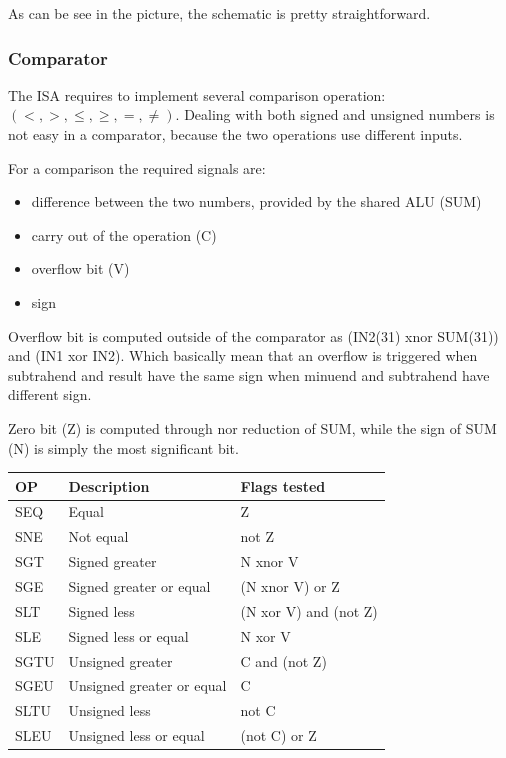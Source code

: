 \documentclass[12pt]{article}
\begin{document}
As can be see in the picture, the schematic is pretty straightforward.


\subsubsection{Comparator}
The ISA requires to implement several comparison operation: $(<, >, \leq, \geq, =, \neq)$.
Dealing with both signed and unsigned numbers is not easy in a comparator, because the two operations use different inputs.

For a comparison the required signals are:
\begin{itemize}
	\item difference between the two numbers, provided by the shared ALU (SUM)
	\item carry out of the operation (C)
	\item overflow bit (V)
	\item sign
\end{itemize}
Overflow bit is computed outside of the comparator as (IN2(31) xnor SUM(31)) and (IN1 xor IN2).
Which basically mean that an overflow is triggered when subtrahend and result have the same sign when minuend and subtrahend have different sign.

Zero bit (Z) is computed through nor reduction of SUM, while the sign of SUM (N) is simply the most significant bit.

\begin{center}
	\begin{tabular}{ | l | l | l |}
		\hline
		OP & Description & Flags tested \\ \hline
		SEQ & Equal & Z \\ \hline
		SNE & Not equal &  not Z \\ \hline
		SGT & Signed greater & N xnor V \\ \hline
		SGE & Signed greater or equal & (N  xnor  V) or Z \\ \hline
		SLT & Signed less & (N xor V) and (not Z)\\ \hline
		SLE & Signed less or equal & N xor V \\ \hline
		SGTU & Unsigned greater & C and (not Z) \\ \hline
		SGEU & Unsigned greater or equal & C \\ \hline
		SLTU & Unsigned less & not C \\ \hline
		SLEU & Unsigned less or equal & (not C) or Z  \\ \hline

	\end{tabular}
\end{center}
\end{document}
